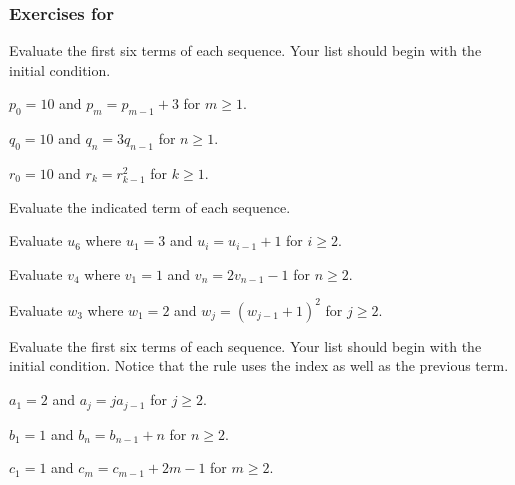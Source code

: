 
\subsubsection*{Exercises for 
 \subrecdefseq}

\begin{exer}[\exerP] %
\label{exer_rec_def_seq_6terms}
    Evaluate the first six terms of each sequence. Your list should begin with the initial condition.
        \begin{exerpart}
            \item $p_0= 10$ and $p_m = p_{m-1} + 3$ for $m \ge 1$. 
            \item $q_0= 10$ and $q_n = 3q_{n-1}$ for $n \ge 1$.
            \item $r_0= 10$ and $r_k = r_{k-1}^2$ for $k \ge 1$.
        \end{exerpart}
\end{exer}

\begin{exer}[\exerP] %
\label{exer_rec_def_seq_find_term}
    Evaluate the indicated term of each sequence.
    \begin{exerpart}
        \item Evaluate $u_6$ where $u_1= 3$ and $u_i = u_{i-1}+1$ for $i \ge 2$.
        \item Evaluate $v_4$ where $v_1= 1$ and $v_n = 2v_{n-1}-1$ for $n \ge 2$.
        \item Evaluate $w_3$ where $w_1= 2$ and $w_j = (w_{j-1}+1)^2$ for $j \ge 2$.
    \end{exerpart}
\end{exer}

\begin{exer}[\exerP] %
\label{exam_rec_def_seq_first6_uses_index}
    Evaluate the first six terms of each sequence. Your list should begin with the initial condition. 
    Notice that the rule uses the index as well as the previous term.   
        \begin{exerpart}
            \item $a_1= 2$ and $a_j = ja_{j-1}$ for $j \ge 2$.
            \item $b_1= 1$ and $b_n = b_{n-1}+n$ for $n \ge 2$.
            \item $c_1= 1$ and $c_m = c_{m-1}+2m-1$ for $m \ge 2$.
        \end{exerpart}
\end{exer}

